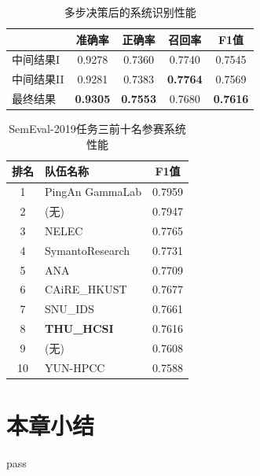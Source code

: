 \begin{table}[htb]
  \centering
  \begin{minipage}[t]{0.6\linewidth}
  \caption{多步决策后的系统识别性能}
  \label{tab:exp_context_emo_ensemble_result}
    \begin{tabularx}{\linewidth}{X|cccc}
    \toprule[1.5pt]
    & 准确率 & 正确率 & 召回率 & F1值 \\
    \hline
    中间结果I & 0.9278 & 0.7360 & 0.7740 & 0.7545 \\
    中间结果II & 0.9281 & 0.7383 & \bf 0.7764 & 0.7569 \\
    \hline
    最终结果 & \bf 0.9305 & \bf 0.7553 & 0.7680 & \bf 0.7616 \\ 
    \bottomrule[1.5pt]
    \end{tabularx}
  \end{minipage}
\end{table}

\begin{table}[htb]
  \centering
  \begin{minipage}[t]{0.6\linewidth}
  \caption{SemEval-2019任务三前十名参赛系统性能} %
  \label{tab:exp_context_emo_other_comp}
    \begin{tabularx}{\linewidth}{c|X|c}
    \toprule[1.5pt]
    排名 & 队伍名称 & F1值 \\
    \hline
    1 & PingAn GammaLab & 0.7959 \\
    2 & (无) & 0.7947 \\
    3 & NELEC & 0.7765 \\
    4 & SymantoResearch & 0.7731 \\
    5 & ANA & 0.7709 \\
    6 & CAiRE\_HKUST & 0.7677 \\
    7 & SNU\_IDS & 0.7661 \\
    8 & \bf THU\_HCSI & 0.7616 \\
    9 & (无) & 0.7608 \\
    10 & YUN-HPCC & 0.7588 \\
    \bottomrule[1.5pt]
    \end{tabularx}
  \end{minipage}
\end{table}



\section{本章小结}

pass

